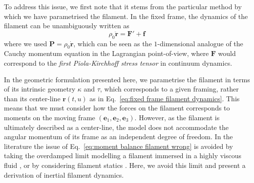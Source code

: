 To address this issue, we first note that it stems from the particular method by which we have parametrised the filament. In the fixed frame, the dynamics of the filament can be unambiguously written as
\begin{equation} \label{eq:fixed frame filament dynamics}
\rho_0 \ddot{\mathbf{r}} = \mathbf{F}' + \mathbf{f}
\end{equation}
where we used $\mathbf{P} = \rho_0 \dot{\mathbf{r}}$, which can be seen as the $1$-dimensional analogue of the Cauchy momentum equation in the Lagrangian point-of-view, where $\mathbf{F}$ would correspond to the \textit{first Piola-Kirchhoff stress tensor} in continuum dynamics.

In the geometric formulation presented here, we parametrise the filament in terms of its intrinsic geometry $\kappa$ and $\tau$, which corresponds to a given framing, rather than its center-line $\mathbf{r}(t,u)$ as in Eq.~\ref{eq:fixed frame filament dynamics}. This means that we must consider how the forces on the filament corresponds to moments on the moving frame $(\mathbf{e}_1, \mathbf{e}_2, \mathbf{e}_3)$. However, as the filament is ultimately described as a center-line, the model does not accommodate the angular momentum of its frame as an independent degree of freedom. In the literature the issue of Eq.~\ref{eq:moment balance filament wrong} is avoided by taking the overdamped limit modelling a filament immersed in a highly viscous fluid \citep{eloyKinematicsMostEfficient2012, tornbergSimulatingDynamicsInteractions2004, goldsteinNonlinearDynamicsStiff1995, sodaDynamicsStiffChains1973, nordgrenComputationMotionElastic1974, hasimotoSolitonVortexFilament1972, powersDynamicsFilamentsMembranes2010, goldsteinViscousNonlinearDynamics1998}, or by considering filament statics \citep{parkerDerivationNonlinearRod1984}. Here, we avoid this limit and present a derivation of inertial filament dynamics.

